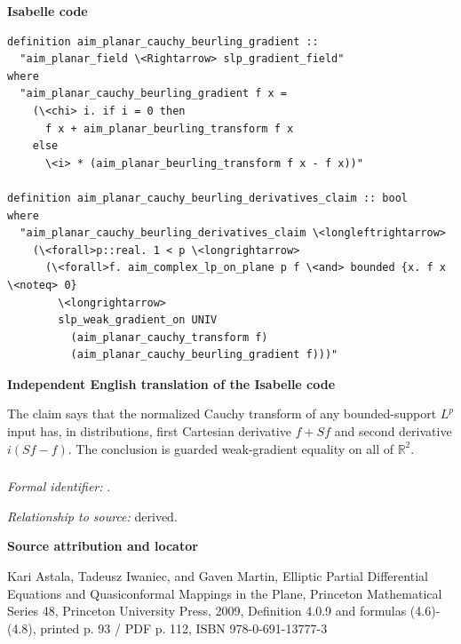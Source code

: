 \documentclass[10pt,oneside]{article}
\newcommand{\reviewlabel}[1]{\par\smallskip\noindent\textsf{\bfseries #1}\par\smallskip}
\begin{document}
\reviewlabel{Isabelle code}
\begin{lstlisting}
definition aim_planar_cauchy_beurling_gradient ::
  "aim_planar_field \<Rightarrow> slp_gradient_field"
where
  "aim_planar_cauchy_beurling_gradient f x =
    (\<chi> i. if i = 0 then
      f x + aim_planar_beurling_transform f x
    else
      \<i> * (aim_planar_beurling_transform f x - f x))"

definition aim_planar_cauchy_beurling_derivatives_claim :: bool
where
  "aim_planar_cauchy_beurling_derivatives_claim \<longleftrightarrow>
    (\<forall>p::real. 1 < p \<longrightarrow>
      (\<forall>f. aim_complex_lp_on_plane p f \<and> bounded {x. f x \<noteq> 0}
        \<longrightarrow>
        slp_weak_gradient_on UNIV
          (aim_planar_cauchy_transform f)
          (aim_planar_cauchy_beurling_gradient f)))"
\end{lstlisting}

\reviewlabel{Independent English translation of the Isabelle code}
The claim says that the normalized Cauchy transform of any bounded-support $L^p$ input has, in distributions, first Cartesian derivative $f+Sf$ and second derivative $i(Sf-f)$. The conclusion is guarded weak-gradient equality on all of $\mathbb R^2$.

\subsubsection{\texttt{}}
\noindent\textit{Formal identifier:} \texttt{}.\par
\noindent\textit{Relationship to source:} derived.

\reviewlabel{Source attribution and locator}
Kari Astala, Tadeusz Iwaniec, and Gaven Martin, Elliptic Partial Differential Equations and Quasiconformal Mappings in the Plane, Princeton Mathematical Series 48, Princeton University Press, 2009, Definition 4.0.9 and formulas (4.6)-(4.8), printed p. 93 / PDF p. 112, ISBN 978-0-691-13777-3
\end{document}
